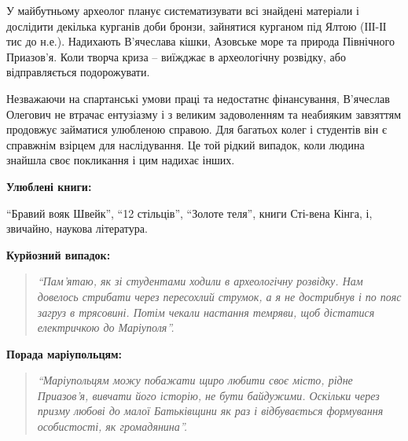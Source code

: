 У майбутньому археолог планує систематизувати всі знайдені матеріали і
дослідити декілька курганів доби бронзи, зайнятися курганом під Ялтою (ІІІ-ІІ
тис до н.е.). Надихають В'ячеслава кішки, Азовське море та природа Північного
Приазов'я. Коли творча криза – виїжджає в археологічну розвідку, або
відправляється подорожувати.

Незважаючи на спартанські умови праці та недостатнє фінансування, В'ячеслав
Олегович не втрачає ентузіазму і з великим задоволенням та неабияким завзяттям
продовжує займатися улюбленою справою. Для багатьох колег і студентів він є
справжнім взірцем для наслідування. Це той рідкий випадок, коли людина знайшла
своє покликання і цим надихає інших.


\textbf{Улюблені книги:} 

\enquote{Бравий вояк Швейк}, \enquote{12 стільців}, \enquote{Золоте теля},
книги Сті\hyp{}вена Кінга, і, звичайно, наукова література.

\textbf{Курйозний випадок:} 

\begin{quote}
\em\enquote{Пам'ятаю, як зі студентами ходили в археологічну розвідку. Нам
довелось стрибати через пересохлий струмок, а я не дострибнув і по пояс загруз
в трясовині. Потім чекали настання темряви, щоб дістатися електричкою до
Маріуполя}.
\end{quote}

\textbf{Порада маріупольцям:} 

\begin{quote}
\em\enquote{Маріупольцям можу побажати щиро любити своє місто, рідне Приазов'я, вивчати
його історію, не бути байдужими. Оскільки через призму любові до малої
Батьківщини як раз і відбувається формування особистості, як
громадянина}.
\end{quote}

